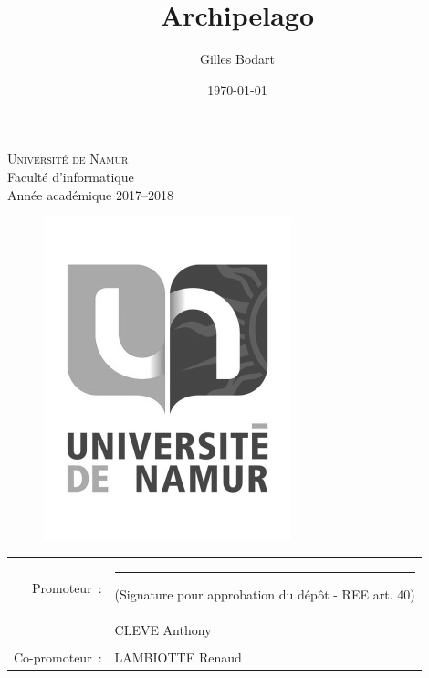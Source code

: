\documentclass[a4paper,fleqn,12pt]{report}
\author{Gilles Bodart}
\date{\today}
\title{Archipelago}
\begin{document}
\thispagestyle{empty}

\begin{center}
\textsc{Universit\'e de Namur}\\
Facult\'e d'informatique\\
Ann\'ee acad\'emique 2017--2018
\end{center}
\vspace{1.3cm}
\hspace{1.4cm}
\begin{center}
\end{center}


\vspace{0.5cm}
\begin{figure}[!h]
\centering\includegraphics[width=.4\textwidth]{figures/unamur.pdf}
\end{figure}

\normalsize


\vspace{0.5cm}
\begin{table}[!h]
\centering
  \begin{tabular}{ r l }
    Promoteur~: &  \rule{4cm}{0.1mm} {\small (Signature pour approbation du d\'ep\^ot - REE art. 40)}\\
    ~\underline& CLEVE Anthony \\\\
    Co-promoteur~: & LAMBIOTTE Renaud  \\
  \end{tabular}
\end{table}
\end{document}
